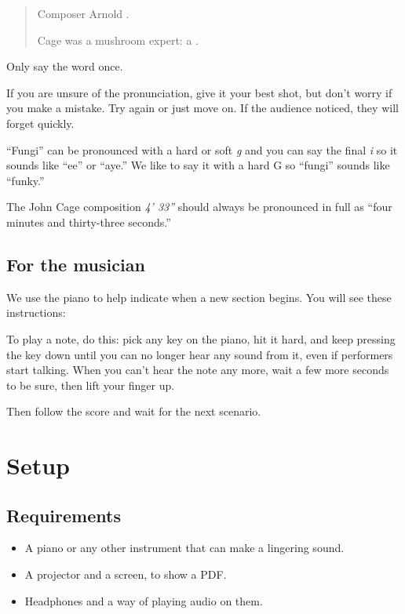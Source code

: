 \begin{quote}

  Composer Arnold .

  Cage was a mushroom expert: a .

\end{quote}


Only say the word once.

If you are unsure of the pronunciation, give it your best shot, but don't worry if you make a mistake.  Try again or just move on.  If the audience noticed, they will forget quickly.

``Fungi'' can be pronounced with a hard or soft \textit{g} and you can say the final \textit{i} so it sounds like ``ee'' or ``aye.''  We like to say it with a hard G so ``fungi'' sounds like ``funky.''

The John Cage composition \textit{4' 33''} should always be pronounced in full as ``four minutes and thirty-three seconds.''

\subsection*{For the musician}

We use the piano to help indicate when a new section begins.  You will see these instructions:


To play a note, do this:  pick any key on the piano, hit it hard, and keep pressing the key down until you can no longer hear any sound from it, even if performers start talking.  When you can't hear the note any more, wait a few more seconds to be sure, then lift your finger up.

Then follow the score and wait for the next scenario.

\newpage

\section{Setup}

\subsection*{Requirements}

\begin{itemize}

  \item A piano or any other instrument that can make a lingering sound.
  \item A projector and a screen, to show a PDF.
  \item Headphones and a way of playing audio on them.

\end{itemize}

